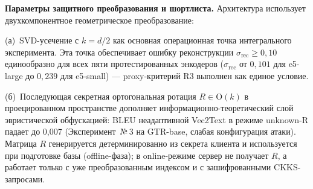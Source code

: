 \documentclass[a4paper, 12pt, oneside, openany]{article}
\begin{document}
\textbf{Параметры защитного преобразования и шортлиста.} Архитектура использует двухкомпонентное геометрическое преобразование:

(а)~SVD-усечение с $k = d/2$ как основная операционная точка интегрального эксперимента. Эта точка обеспечивает ошибку реконструкции $\sigma_{\mathrm{rec}} \geq 0{,}10$ единообразно для всех пяти протестированных энкодеров ($\sigma_{\mathrm{rec}}$ от $0{,}101$ для e5-large до $0{,}239$ для e5-small) --- proxy-критерий R3 выполнен как единое условие.

(б)~Последующая секретная ортогональная ротация $R \in \mathrm{O}(k)$ в проецированном пространстве дополняет информационно-теоретический слой эвристической обфускацией: BLEU неадаптивной Vec2Text в режиме unknown-R падает до 0,007 (Эксперимент~№\,3 на GTR-base, слабая конфигурация атаки). Матрица $R$ генерируется детерминированно из секрета клиента и используется при подготовке базы (offline-фаза); в online-режиме сервер не получает $R$, а работает только с уже преобразованным индексом и с зашифрованными CKKS-запросами.
\end{document}
